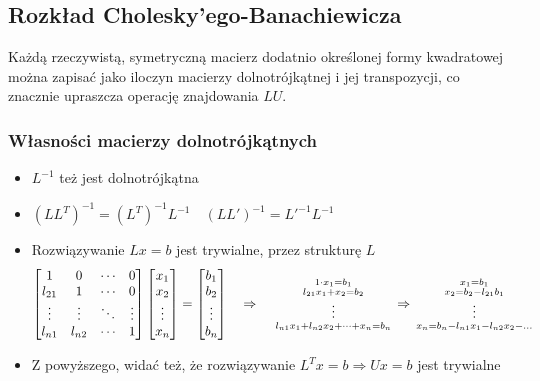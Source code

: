 \documentclass{../notatki}
\begin{document}
\subsection{Rozkład Cholesky'ego-Banachiewicza}

Każdą rzeczywistą, symetryczną macierz dodatnio określonej formy kwadratowej
można zapisać jako iloczyn macierzy dolnotrójkątnej i jej transpozycji, co
znacznie upraszcza operację znajdowania $LU$.

\subsubsection{Własności macierzy dolnotrójkątnych}

\begin{itemize}
  \item $L^{-1}$ też jest dolnotrójkątna
  \item $(LL^T)^{-1} = (L^T)^{-1}L^{-1} \quad (LL')^{-1} = L'^{-1}L^{-1}$
  \item Rozwiązywanie $Lx = b$ jest trywialne, przez strukturę $L$
    $$
    \begin{bmatrix}
      1 & 0 & \cdots & 0 \\
      l_{21} & 1 & \cdots & 0 \\
      \vdots & \vdots & \ddots & \vdots \\
      l_{n1} & l_{n2} & \cdots & 1 \\
    \end{bmatrix}
    \begin{bmatrix}
      x_1 \\
      x_2 \\
      \vdots \\
      x_n
    \end{bmatrix}
    =
    \begin{bmatrix}
      b_1 \\
      b_2 \\
      \vdots \\
      b_n
    \end{bmatrix}
    \quad
    \Rightarrow
    \quad
    \begin{smallmatrix}
      1 \cdot x_1 = b_1 \\
      l_{21} x_1 + x_2 = b_2 \\
      \vspace{0.2em}\vdots \\
      l_{n1} x_1 + l_{n2} x_2 + \dots + x_n = b_n
    \end{smallmatrix}
    \Rightarrow
    \begin{smallmatrix}
      x_1 = b_1 \\
      x_2 = b_2 - l_{21} b_1\\
      \vspace{0.2em}\vdots \\
      x_n = b_n - l_{n1} x_1 - l_{n2} x_2 - \dots
    \end{smallmatrix}
    $$
  \item Z powyższego, widać też, że rozwiązywanie $L^Tx = b
    \Rightarrow Ux=b$ jest trywialne
\end{itemize}
\end{document}
